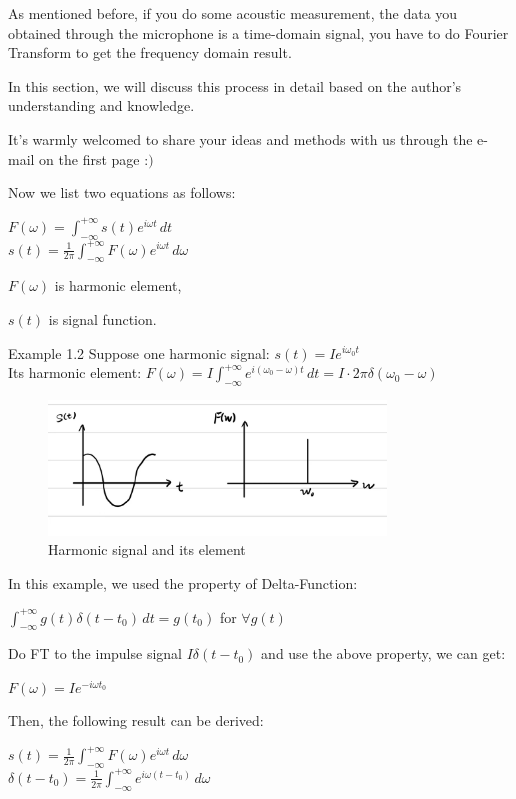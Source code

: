 \documentclass[graybox]{svmult}
\begin{document}
As mentioned before, if you do some acoustic measurement, the data you obtained through the microphone is a time-domain signal, you have to do Fourier Transform to get the frequency domain result. 

In this section, we will discuss this process in detail based on the author's understanding and knowledge. 

It's warmly welcomed to share your ideas and methods with us through the e-mail on the first page $ \text{:)} $

Now we list two equations as follows:
\begin{center}
$ F(\omega ) =  \int_{-\infty}^{+\infty} s(t)e^{i\omega t} \,dt  $ \\
$ s(t) = \frac{1}{2\pi} \int_{-\infty}^{+\infty} F(\omega)e^{i\omega t} \,d\omega  $
\end{center}

$  F(\omega ) $ is harmonic element, 

$ s(t) $ is signal function. \\

\begin{legaltext}{Example 1.2}
\indent 
Suppose one harmonic signal: $ s(t)=Ie^{i\omega_0 t} $ \\
\indent 
Its harmonic element: $ F(\omega )=I \int_{-\infty}^{+\infty} e^{i(\omega_0-\omega) t} \,dt = I\cdot2\pi\delta(\omega_0-\omega)$

\begin{figure}[h!]
    \centering
    \includegraphics[width=0.8\textwidth]
    {Fig.1.2.1.jpg} %
    \caption{Harmonic signal and its element}
    \label{fig:example}
\end{figure}

In this example, we used the property of Delta-Function:
\begin{center}
$ \int_{-\infty}^{+\infty}g(t)\delta(t-t_0) \,dt = g(t_0) $ for $ \forall g(t) $
\end{center}

Do FT to the impulse signal $ I\delta(t-t_0)$ and use the above property, we can get:
\begin{center}
    $ F(\omega) = Ie^{-i\omega t_0} $
\end{center} 

Then, the following result can be derived:
\begin{center}
    $ s(t) = \frac{1}{2\pi} \int_{-\infty}^{+\infty} F(\omega)e^{i\omega t} \,d\omega  $ \\
    $ \delta(t-t_0) = \frac{1}{2\pi} \int_{-\infty}^{+\infty} e^{i\omega (t-t_0)} \,d\omega  $
\end{center}

\end{legaltext}
\end{document}
